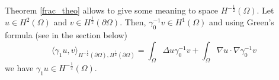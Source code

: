 Theorem \ref{frac_theo} allows to give some meaning to space \(H^{-\frac{1}{2}}(\Omega)\). Let \(u \in H^2(\Omega)\) and \(v \in H^\frac{1}{2}(\partial\Omega)\). Then, \(\gamma_0^{-1}v \in H^1(\Omega)\) and using Green's formula (see in the section below)
\[
    \langle \gamma_1 u, v \rangle_{H^{-\frac{1}{2}}(\partial\Omega), H^{\frac{1}{2}}(\partial\Omega)} = \int_\Omega \Delta u \gamma_0^{-1}v + \int_\Omega \nabla u \cdot \nabla \gamma_0^{-1}v
\]
we have \(\gamma_1 u \in H^{-\frac{1}{2}}(\Omega)\).



